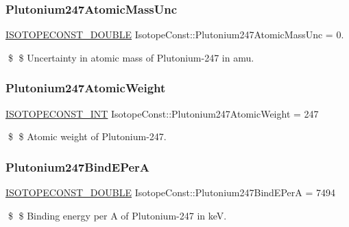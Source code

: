 \subsubsection{\texorpdfstring{Plutonium247\+Atomic\+Mass\+Unc}{Plutonium247AtomicMassUnc}}
{\footnotesize\ttfamily \mbox{\hyperlink{group___isotope_const-_macros_ga8f45a7272ce02c0b4c65c44636ed719a}{I\+S\+O\+T\+O\+P\+E\+C\+O\+N\+S\+T\+\_\+\+D\+O\+U\+B\+LE}} Isotope\+Const\+::\+Plutonium247\+Atomic\+Mass\+Unc = 0.}

\$ \$ Uncertainty in atomic mass of Plutonium-\/247 in amu. \mbox{\label{group___isotope_const-_plutonium-_pu247_ga8366d339a9738b93b11604793b5735bc}} 
\subsubsection{\texorpdfstring{Plutonium247\+Atomic\+Weight}{Plutonium247AtomicWeight}}
{\footnotesize\ttfamily \mbox{\hyperlink{group___isotope_const-_macros_ga5f18360b3e99483a35c32d789e62621c}{I\+S\+O\+T\+O\+P\+E\+C\+O\+N\+S\+T\+\_\+\+I\+NT}} Isotope\+Const\+::\+Plutonium247\+Atomic\+Weight = 247}

\$ \$ Atomic weight of Plutonium-\/247. \mbox{\label{group___isotope_const-_plutonium-_pu247_ga20155e9c9371807fd38ee0bacfd9a1f5}} 
\subsubsection{\texorpdfstring{Plutonium247\+Bind\+E\+PerA}{Plutonium247BindEPerA}}
{\footnotesize\ttfamily \mbox{\hyperlink{group___isotope_const-_macros_ga8f45a7272ce02c0b4c65c44636ed719a}{I\+S\+O\+T\+O\+P\+E\+C\+O\+N\+S\+T\+\_\+\+D\+O\+U\+B\+LE}} Isotope\+Const\+::\+Plutonium247\+Bind\+E\+PerA = 7494}

\$ \$ Binding energy per A of Plutonium-\/247 in keV. \mbox{\label{group___isotope_const-_plutonium-_pu247_gac2c454e91f69675a39ff008f379810db}} 
